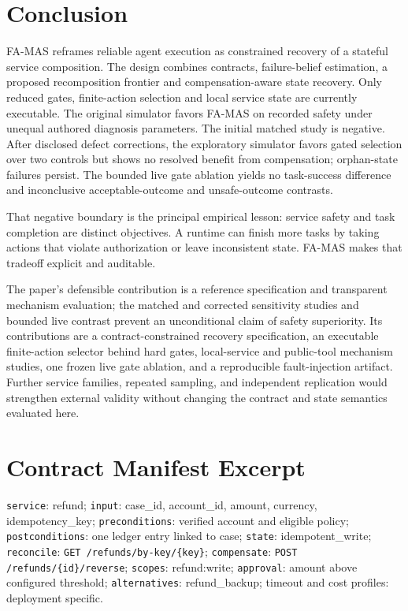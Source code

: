 \documentclass[10pt,journal,compsoc]{IEEEtran}
\newcommand{\famas}{FA-MAS}
\begin{document}
\section{Conclusion}\label{sec:conclusion}
\famas{} reframes reliable agent execution as constrained recovery of a stateful service composition. The design combines contracts, failure-belief estimation, a proposed recomposition frontier and compensation-aware state recovery. Only reduced gates, finite-action selection and local service state are currently executable. The original simulator favors \famas{} on recorded safety under unequal authored diagnosis parameters. The initial matched study is negative. After disclosed defect corrections, the exploratory simulator favors gated selection over two controls but shows no resolved benefit from compensation; orphan-state failures persist. The bounded live gate ablation yields no task-success difference and inconclusive acceptable-outcome and unsafe-outcome contrasts.

That negative boundary is the principal empirical lesson: service safety and task completion are distinct objectives. A runtime can finish more tasks by taking actions that violate authorization or leave inconsistent state. \famas{} makes that tradeoff explicit and auditable.

The paper's defensible contribution is a reference specification and transparent mechanism evaluation; the matched and corrected sensitivity studies and bounded live contrast prevent an unconditional claim of safety superiority. Its contributions are a contract-constrained recovery specification, an executable finite-action selector behind hard gates, local-service and public-tool mechanism studies, one frozen live gate ablation, and a reproducible fault-injection artifact. Further service families, repeated sampling, and independent replication would strengthen external validity without changing the contract and state semantics evaluated here.

\ifieeeclass
\appendices
\else
\appendix
\fi
\section{Contract Manifest Excerpt}
\texttt{service}: refund; \texttt{input}: case\_id, account\_id, amount, currency, idempotency\_key; \texttt{preconditions}: verified account and eligible policy; \texttt{postconditions}: one ledger entry linked to case; \texttt{state}: idempotent\_write; \texttt{reconcile}: \texttt{GET /refunds/by-key/\{key\}}; \texttt{compensate}: \texttt{POST /refunds/\{id\}/reverse}; \texttt{scopes}: refund:write; \texttt{approval}: amount above configured threshold; \texttt{alternatives}: refund\_backup; timeout and cost profiles: deployment specific.
\end{document}
